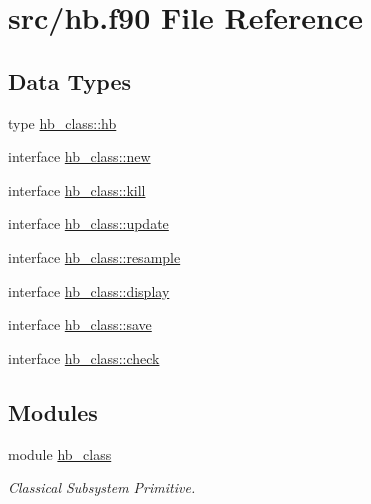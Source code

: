 \hypertarget{hb_8f90}{}\section{src/hb.f90 File Reference}
\label{hb_8f90}
\subsection*{Data Types}
\begin{DoxyCompactItemize}
\item 
type \hyperlink{structhb__class_1_1hb}{hb\+\_\+class\+::hb}
\item 
interface \hyperlink{interfacehb__class_1_1new}{hb\+\_\+class\+::new}
\item 
interface \hyperlink{interfacehb__class_1_1kill}{hb\+\_\+class\+::kill}
\item 
interface \hyperlink{interfacehb__class_1_1update}{hb\+\_\+class\+::update}
\item 
interface \hyperlink{interfacehb__class_1_1resample}{hb\+\_\+class\+::resample}
\item 
interface \hyperlink{interfacehb__class_1_1display}{hb\+\_\+class\+::display}
\item 
interface \hyperlink{interfacehb__class_1_1save}{hb\+\_\+class\+::save}
\item 
interface \hyperlink{interfacehb__class_1_1check}{hb\+\_\+class\+::check}
\end{DoxyCompactItemize}
\subsection*{Modules}
\begin{DoxyCompactItemize}
\item 
module \hyperlink{namespacehb__class}{hb\+\_\+class}
\begin{DoxyCompactList}\small\item\em Classical Subsystem Primitive. \end{DoxyCompactList}\end{DoxyCompactItemize}
